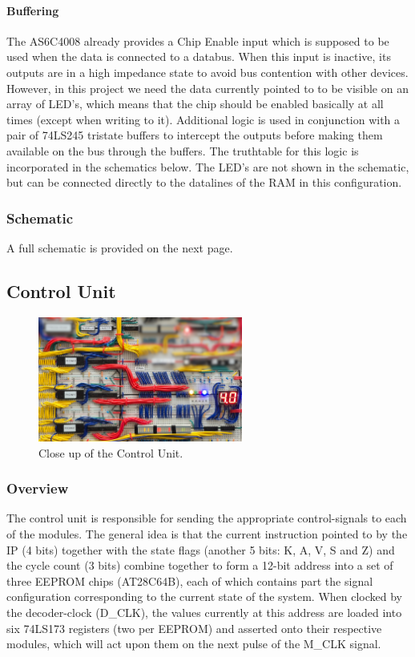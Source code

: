 \paragraph{Buffering} The AS6C4008 already provides a Chip Enable input which is supposed to be used when the data is connected to a databus. When this input is inactive, its outputs are in a high impedance state to avoid bus contention with other devices. However, in this project we need the data currently pointed to to be visible on an array of LED's, which means that the chip should be enabled basically at all times (except when writing to it). Additional logic is used in conjunction with a pair of 74LS245 tristate buffers to intercept the outputs before making them available on the bus through the buffers. The truthtable for this logic is incorporated in the schematics below. The LED's are not shown in the schematic, but can be connected directly to the datalines of the RAM in this configuration. 

\subsubsection{Schematic}
A full schematic is provided on the next page.




\subsection{Control Unit}\label{sec:implementation:cu}
\begin{figure}[H]
  \centering
  \includegraphics[width=0.6\textwidth]{img/controlunitcloseup}
  \caption{Close up of the Control Unit.}
  \label{fig:controlunitcloseup}
\end{figure}

\subsubsection{Overview}
The control unit is responsible for sending the appropriate control-signals to each of the modules. The general idea is that the current instruction pointed to by the IP (4 bits) together with the state flags (another 5 bits: K, A, V, S and Z) and the cycle count (3 bits) combine together to form a 12-bit address into a set of three EEPROM chips (AT28C64B), each of which contains part the signal configuration corresponding to the current state of the system. When clocked by the decoder-clock (D\_CLK), the values currently at this address are loaded into six 74LS173 registers (two per EEPROM) and asserted onto their respective modules, which will act upon them on the next pulse of the M\_CLK signal.

